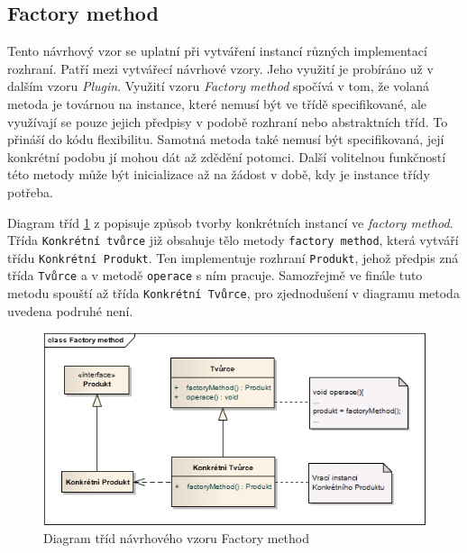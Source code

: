 \documentclass[11pt,twoside,a4paper]{book}
\begin{document}
\subsection{Factory method}
Tento návrhový vzor se uplatní při vytváření instancí různých implementací rozhraní. Patří mezi vytvářecí návrhové vzory. Jeho využití je probíráno už v dalším vzoru \textit{Plugin}. Využití vzoru \textit{Factory method} spočívá v tom, že volaná metoda je továrnou na instance, které nemusí být ve třídě specifikované, ale využívají se pouze jejich předpisy v podobě rozhraní nebo abstraktních tříd. To přináší do kódu flexibilitu. Samotná metoda také nemusí být specifikovaná, její konkrétní podobu jí mohou dát až zdědění potomci.
Další volitelnou funkčností této metody může být inicializace až na žádost v době, kdy je instance třídy potřeba.

Diagram tříd \ref{fig:factorymethod} z \cite{GOF} popisuje způsob tvorby konkrétních instancí ve \textit{factory method}. Třída \texttt{Konkrétní tvůrce} již obsahuje tělo metody \texttt{factory method}, která vytváří třídu \texttt{Konkrétní Produkt}. Ten implementuje rozhraní \texttt{Produkt}, jehož předpis zná třída \texttt{Tvůrce} a v metodě \texttt{operace} s ním pracuje. Samozřejmě ve finále tuto metodu spouští až třída \texttt{Konkrétní Tvůrce}, pro zjednodušení v diagramu metoda uvedena podruhé není.

\begin{figure}[h!]
\begin{center}
\includegraphics[scale=0.7]{figures/factorymethod}
\caption{Diagram tříd návrhového vzoru Factory method}
\label{fig:factorymethod}
\end{center}
\end{figure}
\end{document}
